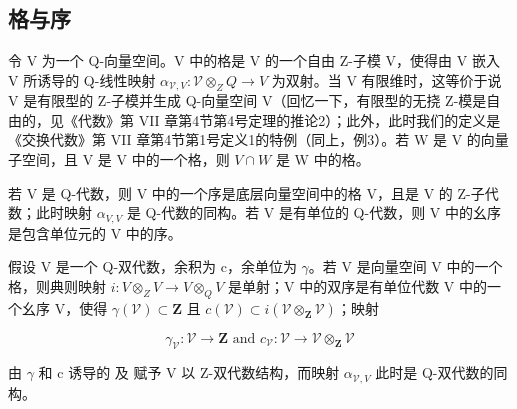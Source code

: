 \subsection{格与序}

令 V 为一个 Q-向量空间。V 中的格是 V 的一个自由 Z-子模 V，使得由 V 嵌入 V 所诱导的 Q-线性映射 \(\alpha_{\mathcal{V},V} : \mathcal{V} \otimes_{Z} Q \to V\) 为双射。当 V 有限维时，这等价于说 V 是有限型的 Z-子模并生成 Q-向量空间 V（回忆一下，有限型的无挠 Z-模是自由的，见《代数》第 VII 章第4节第4号定理的推论2）；此外，此时我们的定义是《交换代数》第 VII 章第4节第1号定义1的特例（同上，例3）。若 W 是 V 的向量子空间，且 V 是 V 中的一个格，则 \(V \cap W\) 是 W 中的格。

若 V 是 Q-代数，则 V 中的一个序是底层向量空间中的格 V，且是 V 的 Z-子代数；此时映射 \(\alpha_{V,V}\) 是 Q-代数的同构。若 V 是有单位的 Q-代数，则 V 中的幺序是包含单位元的 V 中的序。

假设 V 是一个 Q-双代数，余积为 c，余单位为 \(\gamma\)。若 V 是向量空间 V 中的一个格，则典则映射 \(i: V \otimes_{Z} V \to V \otimes_{Q} V\) 是单射；V 中的双序是有单位代数 V 中的一个幺序 V，使得 \(\gamma(\mathcal{V}) \subset \mathbf{Z}\) 且 \(c(\mathcal{V}) \subset i(\mathcal{V} \otimes_{\mathbf{Z}} \mathcal{V})\)；映射

\[
\gamma_ {\mathcal {V}} \colon \mathcal {V} \to \mathbf {Z} \text { and } c _ {\mathcal {V}} \colon \mathcal {V} \to \mathcal {V} \otimes_ {\mathbf {Z}} \mathcal {V}
\]

由 \(\gamma\) 和 c 诱导的  及  赋予 V 以 Z-双代数结构，而映射 \(\alpha_{\mathcal{V},V}\) 此时是 Q-双代数的同构。

